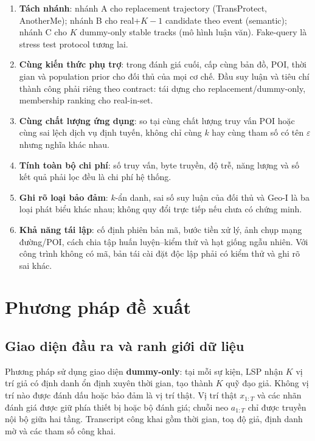 \documentclass[12pt,a4paper,oneside]{report}
\begin{document}
\begin{enumerate}
  \item \textbf{Tách nhánh}: nhánh A cho replacement trajectory (TransProtect, AnotherMe); nhánh B cho real+$K-1$ candidate theo event (semantic); nhánh C cho $K$ dummy-only stable tracks (mô hình luận văn). Fake-query là stress test protocol tương lai.
  \item \textbf{Cùng kiến thức phụ trợ}: trong đánh giá cuối, cấp cùng bản đồ, POI, thời gian và population prior cho đối thủ của mọi cơ chế. Đầu suy luận và tiêu chí thành công phải riêng theo contract: tái dựng cho replacement/dummy-only, membership ranking cho real-in-set.
  \item \textbf{Cùng chất lượng ứng dụng}: so tại cùng chất lượng truy vấn POI hoặc cùng sai lệch dịch vụ định tuyến, không chỉ cùng $k$ hay cùng tham số có tên $\varepsilon$ nhưng nghĩa khác nhau.
  \item \textbf{Tính toàn bộ chi phí}: số truy vấn, byte truyền, độ trễ, năng lượng và số kết quả phải lọc đều là chi phí hệ thống.
  \item \textbf{Ghi rõ loại bảo đảm}: $k$-ẩn danh, sai số suy luận của đối thủ và Geo-I là ba loại phát biểu khác nhau; không quy đổi trực tiếp nếu chưa có chứng minh.
  \item \textbf{Khả năng tái lập}: cố định phiên bản mã, bước tiền xử lý, ảnh chụp mạng đường/POI, cách chia tập huấn luyện--kiểm thử và hạt giống ngẫu nhiên. Với công trình không có mã, bản tái cài đặt độc lập phải có kiểm thử và ghi rõ sai khác.
\end{enumerate}

\chapter{Phương pháp đề xuất}
\label{ch:method}

\section{Giao diện đầu ra và ranh giới dữ liệu}

Phương pháp sử dụng giao diện \textbf{dummy-only}: tại mỗi sự kiện, LSP nhận $K$ vị trí giả có định danh ổn định xuyên thời gian, tạo thành $K$ quỹ đạo giả. Không vị trí nào được đánh dấu hoặc bảo đảm là vị trí thật. Vị trí thật $x_{1:T}$ và các nhãn đánh giá được giữ phía thiết bị hoặc bộ đánh giá; chuỗi neo $a_{1:T}$ chỉ được truyền nội bộ giữa hai tầng. Transcript công khai gồm thời gian, toạ độ giả, định danh mờ và các tham số công khai.
\end{document}
